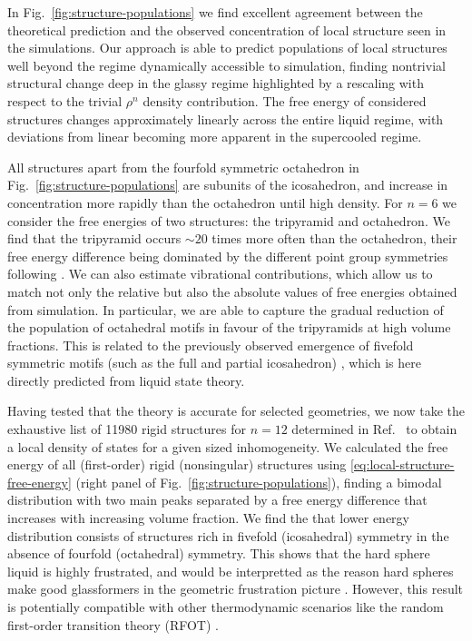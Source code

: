 \documentclass[11pt,twoside]{report}
\begin{document}
In Fig.\ \ref{fig:structure-populations} we find excellent agreement between the theoretical prediction and the observed concentration of local structure seen in the simulations.
Our approach is able to predict populations of local structures well beyond the regime dynamically accessible to simulation, finding nontrivial structural change deep in the glassy regime highlighted by a rescaling with respect to the trivial $\rho^n$ density contribution.
The free energy of considered structures changes approximately linearly across the entire liquid regime, with deviations from linear becoming more apparent in the supercooled regime.

All structures apart from the fourfold symmetric octahedron in Fig.\ \ref{fig:structure-populations} are subunits of the icosahedron, and increase in concentration more rapidly than the octahedron until high density.
For $n=6$ we consider the free energies of two structures: the tripyramid and octahedron.
We find that the tripyramid occurs $\sim20$ times more often than the octahedron, their free energy difference being dominated by the different point group symmetries following \cite{MalinsJPCM2009,MengS2010}.
We can also estimate vibrational contributions, which allow us to match not only the relative but also the absolute values of free energies obtained from simulation.
In particular, we are able to capture the gradual reduction of the population of octahedral motifs in favour of the tripyramids at high volume fractions.
This is related to the previously observed emergence of fivefold symmetric motifs (such as the full and partial icosahedron) \cite{RoyallPR2015,TarjusJPCM2005,HallettNC2018,DunleavyNC2015}, which is here directly predicted from liquid state theory.

Having tested that the theory is accurate for selected geometries, we now take the exhaustive list of 11980 rigid structures for $n=12$ determined in Ref.\ \cite{Holmes-CerfonSR2016} to obtain a local density of states for a given sized inhomogeneity.
We calculated the free energy of all (first-order) rigid (nonsingular) structures using \eqref{eq:local-structure-free-energy} (right panel of Fig.\ \ref{fig:structure-populations}), finding a bimodal distribution with two main peaks separated by a free energy difference that increases with increasing volume fraction.
We find the that lower energy distribution consists of structures rich in fivefold (icosahedral) symmetry in the absence of fourfold (octahedral) symmetry.
This shows that the hard sphere liquid is highly frustrated, and would be interpretted as the reason hard spheres make good glassformers in the geometric frustration picture \cite{KivelsonPA1995,TarjusJPCM2005}.
However, this result is potentially compatible with other thermodynamic scenarios like the random first-order transition theory (RFOT) \cite{LubchenkoARPC2007}.
\end{document}
